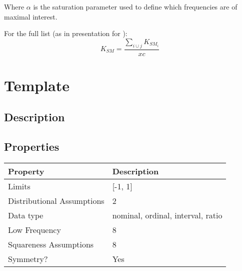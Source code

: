 \documentclass[11pt]{article}
\begin{document}
Where $\alpha$ is the saturation parameter used to define which frequencies are of maximal interest.

For the full list (as in presentation for \cite{kilgarriff2012getting}):
$$
K_{SM} = \frac{ \sum_{i \cup j}{ K_{SM_i} } }{ xc } 
$$












\section{Template} %
\subsection{Description}

\subsection{Properties}
\begin{tabular}{| l || l |}
    \hline
    {\bf Property} & {\bf Description} \\
    \hline
    Limits & [-1, 1] \\ \hline

    Distributional Assumptions& 2 \\ \hline

    Data type & nominal, ordinal, interval, ratio \\ \hline

    Low Frequency & 8 \\ \hline

    Squareness Assumptions & 8 \\ \hline
    
    Symmetry? & Yes \\ \hline

\end{tabular}
\end{document}
